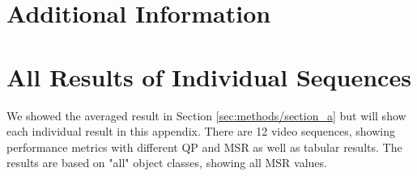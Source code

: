 \chapter{Additional Information}


\newpage

\newpage

\newpage

\newpage

\newpage

\chapter{All Results of Individual Sequences}
We showed the averaged result in Section \ref{sec:methods/section_a} but will show each individual result in this appendix. There are 12 video sequences, showing performance metrics with different QP and MSR as well as tabular results. The results are based on "all" object classes, showing all MSR values.

\newpage

\newpage

\newpage

\newpage

\newpage

\newpage

\newpage

\newpage

\newpage

\newpage

\newpage

\newpage






